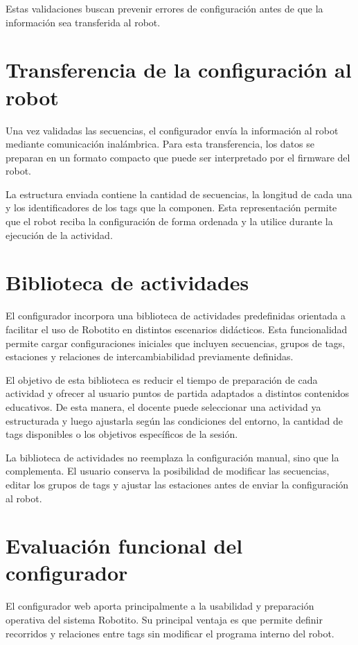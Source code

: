 \documentclass{prgrado}
\begin{document}
Estas validaciones buscan prevenir errores de configuración antes de que la información sea transferida al robot.

\section{Transferencia de la configuración al robot}

Una vez validadas las secuencias, el configurador envía la información al robot mediante comunicación inalámbrica. Para esta transferencia, los datos se preparan en un formato compacto que puede ser interpretado por el firmware del robot.

La estructura enviada contiene la cantidad de secuencias, la longitud de cada una y los identificadores de los tags que la componen. Esta representación permite que el robot reciba la configuración de forma ordenada y la utilice durante la ejecución de la actividad.


\section{Biblioteca de actividades}

El configurador incorpora una biblioteca de actividades predefinidas orientada a facilitar el uso de Robotito en distintos escenarios didácticos. Esta funcionalidad permite cargar configuraciones iniciales que incluyen secuencias, grupos de tags, estaciones y relaciones de intercambiabilidad previamente definidas.

El objetivo de esta biblioteca es reducir el tiempo de preparación de cada actividad y ofrecer al usuario puntos de partida adaptados a distintos contenidos educativos. De esta manera, el docente puede seleccionar una actividad ya estructurada y luego ajustarla según las condiciones del entorno, la cantidad de tags disponibles o los objetivos específicos de la sesión.


La biblioteca de actividades no reemplaza la configuración manual, sino que la complementa. El usuario conserva la posibilidad de modificar las secuencias, editar los grupos de tags y ajustar las estaciones antes de enviar la configuración al robot.

\section{Evaluación funcional del configurador}

El configurador web aporta principalmente a la usabilidad y preparación operativa del sistema Robotito. Su principal ventaja es que permite definir recorridos y relaciones entre tags sin modificar el programa interno del robot.
\end{document}

